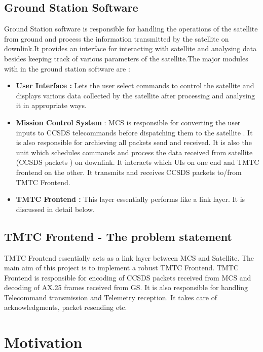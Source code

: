 \documentclass[BTech]{iitmdiss}
\begin{document}
 \subsection{Ground Station Software}
 Ground Station software is responsible for handling the operations of the satellite from ground and process the information transmitted by the satellite on downlink.It provides an interface for interacting with satellite and analysing data besides keeping track of various parameters of the satellite.The major modules with in the ground station software are : 
 
 \begin{itemize}
 \item \textbf{User Interface : }Lets the user select commands to control the satellite and displays various data collected by the satellite after processing and analysing it in appropriate ways.
 \item \textbf{Mission Control System }: MCS is responsible for converting the user inputs to CCSDS telecommands before dispatching them to the satellite . It is also responsible for archieving all packets send and received. It is also the unit which schedules commands and process the data received from satellite (CCSDS packets ) on downlink. It interacts which UIs on one end and TMTC frontend on the other. It transmits and receives CCSDS packets to/from TMTC Frontend.
 \item \textbf{TMTC Frontend : } This layer essentially performs like a link layer. It is discussed in detail below. 
 \end{itemize}
 
 \subsection{TMTC Frontend - The problem statement}
 TMTC Frontend essentially acts as a link layer between MCS and Satellite. The main aim of this project is to implement a robust TMTC Frontend. TMTC Frontend is responsible for encoding of CCSDS packets received from MCS and decoding of AX.25 frames received from GS. It is also responsible for handling Telecommand transmission  and Telemetry reception. It takes care of acknowledgments, packet resending etc. 
 
 
 \section{Motivation}
 
\end{document}
